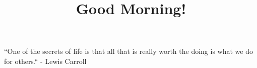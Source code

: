 \documentclass{ximera}
\title{Good Morning!}
\begin{document}
\begin{abstract}

\end{abstract}

\maketitle

``One of the secrets of life is that all that is really worth the doing is what we do for others.`` - Lewis Carroll
\end{document}
